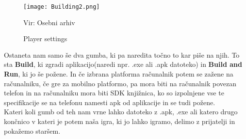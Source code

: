 \begin{figure}[ht!]
	\centering
	\texttt{[image: Building2.png]}
	\caption{Player settings}
	{\tiny Vir: Osebni arhiv}
\end{figure}
Ostaneta nam samo še dva gumba, ki pa naredita točno to kar piše na njih. To sta \textbf{Build}, ki zgradi aplikacijo(naredi npr. .exe ali .apk datoteko) in \textbf{Build and Run}, ki jo še požene. In če izbrana platforma računalnik potem se zažene na računalniku, če gre za mobilno platformo, pa mora biti na računalnik povezan telefon in na računalniku mora biti SDK knjižnica, ko so izpolnjene vse te specifikacije se na telefonu namesti apk od aplikacije in se tudi požene.\\
Kateri koli gumb od teh nam vrne lahko datoteko z .apk, .exe ali katero drugo končnico v kateri je potem naša igra, ki jo lahko igramo, delimo z prijatelji in pokažemo staršem.